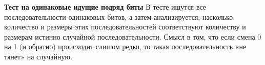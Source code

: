 \textbf{Тест на одинаковые идущие подряд биты}
В тесте ищутся все последовательности одинаковых битов, а затем анализируется, насколько количество и размеры этих последовательностей соответствуют количеству и размерам истинно случайной последовательности. Смысл в том, что если смена 0 на 1 (и обратно) происходит слишом редко, то такая последовательность «не тянет» на случайную. \cite{habrahabr-nist} 




